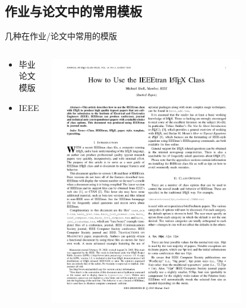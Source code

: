 \subsection{作业与论文中的常用模板}
\begin{frame}{几种在作业/论文中常用的模版}
    \begin{columns}[c]
    \begin{column}{.45\textwidth}
        \begin{itemize}
            \item 毕业论文模版
            \item IEEE 
        \end{itemize}
    \end{column}
    \begin{column}{.45\textwidth}
        \includegraphics[width=0.75\textwidth]{docs/IEEE_template_1.pdf}
      \end{column}
    \end{columns}
    

\end{frame}
